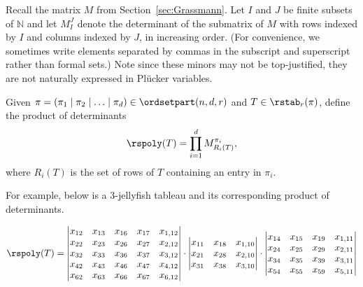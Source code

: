 Recall the matrix $M$ from Section~\ref{sec:Grassmann}. Let $I$ and $J$ be finite subsets of $\mathbb{N}$ and let $M_I^J$ denote the determinant of the submatrix of $M$ with rows indexed by $I$ and columns indexed by $J$, in increasing order. (For convenience, we sometimes write elements separated by commas in the subscript and superscript rather than formal sets.) Note since these minors may not be top-justified, they are not naturally expressed in Pl\"ucker variables.

\begin{definition}
\label{def:rsdet}
Given $\pi=(\pi_1\mid \pi_2\mid\ldots\mid \pi_d)\in\ordsetpart(n,d,r)$ and $T\in \rstab_r(\pi)$, define the product of determinants \[\rspoly(T)= 
\displaystyle\prod_{i=1}^d M_{R_i(T)}^{\pi_i},\] where $R_i(T)$ is the set of rows of $T$ containing an entry in $\pi_i$.
\end{definition}

\begin{example}\label{ex:3-jellyfish}
For example, below is a $3$-jellyfish tableau and its corresponding product of determinants. 
\begin{center}
\hspace{.5in}
$\rspoly(T)=\begin{vmatrix}
x_{12} & x_{13} & x_{16} & x_{17} & x_{1,12}\\
x_{22} & x_{23} & x_{26} & x_{27} & x_{2,12}\\
x_{32} & x_{33} & x_{36} & x_{37} & x_{3,12}\\
x_{42} & x_{43} & x_{46} & x_{47} & x_{4,12}\\
x_{62} & x_{63} & x_{66} & x_{67} & x_{6,12}
\end{vmatrix}\cdot
\begin{vmatrix}
x_{11} & x_{18} & x_{1,10}\\
x_{21} & x_{28} & x_{2,10}\\
x_{31} & x_{38} & x_{3,10} 
\end{vmatrix}\cdot
\begin{vmatrix}
x_{14} & x_{15} & x_{19} & x_{1,11} \\
x_{24} & x_{25} & x_{29} & x_{2,11} \\
x_{34} & x_{35} & x_{39} & x_{3,11} \\
x_{54} & x_{55} & x_{59} & x_{5,11} 

\end{vmatrix}
$

\end{center}
\end{example}

